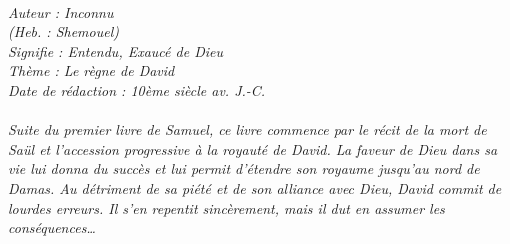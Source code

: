 \BFont
\noindent\hrulefill
{\footnotesize
\textit{
\bigskip
{\centering{}
\\Auteur : Inconnu
\\(Heb. : Shemouel)
\\Signifie : Entendu, Exaucé de Dieu
\\Thème : Le règne de David
\\Date de rédaction : 10ème siècle av. J.-C.\\}
}
\textit{
\\Suite du premier livre de Samuel, ce livre commence par le récit de la mort de Saül et l’accession progressive à la royauté de David. La faveur de Dieu dans sa vie lui donna du succès et lui permit d’étendre son royaume jusqu’au nord de Damas. Au détriment de sa piété et de son alliance avec Dieu, David commit de lourdes erreurs. Il s’en repentit sincèrement, mais il dut en assumer les conséquences…\bigskip
}
}
\par\nobreak\noindent\hrulefill
